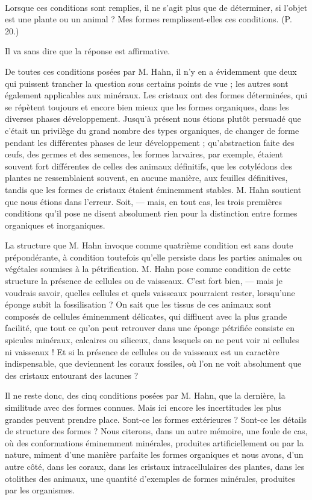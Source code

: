 \documentclass[a4paper, 12pt, oneside, french]{article}
\begin{document}
\paragraph{}
\og Lorsque ces conditions sont remplies, il ne s'agit plus que de déterminer, si l'objet est une plante ou un animal ? Mes formes remplissent-elles ces conditions. \fg (P. 20.)

Il va sans dire que la réponse est affirmative.

De toutes ces conditions posées par M. Hahn, il n'y en a évidemment que deux qui puissent trancher la question sous certains points de vue ; les autres sont également applicables aux minéraux. Les cristaux ont des formes déterminées, qui se répètent toujours et encore bien mieux que les formes organiques, dans les diverses phases développement. Jusqu'à présent nous étions plutôt persuadé que c'était un privilège du grand nombre des types organiques, de changer de forme pendant les différentes phases de leur développement ; qu'abstraction faite des œufs, des germes et des semences, les formes larvaires, par exemple, étaient souvent fort différentes de celles des animaux définitifs, que les cotylédons des plantes ne ressemblaient souvent, en aucune manière, aux feuilles définitives, tandis que les formes de cristaux étaient éminemment stables. M. Hahn soutient que nous étions dans l'erreur. Soit, --- mais, en tout cas, les trois premières conditions qu'il pose ne disent absolument rien pour la distinction entre formes organiques et inorganiques.

La structure que M. Hahn invoque comme quatrième condition est sans doute prépondérante, à condition toutefois qu'elle persiste dans les parties animales ou végétales soumises à la pétrification. M. Hahn pose comme condition de cette structure la présence de cellules ou de vaisseaux. C'est fort bien, --- mais je voudrais savoir, quelles cellules et quels vaisseaux pourraient rester, lorsqu'une éponge subit la fossilisation ? On sait que les tissus de ces animaux sont composés de cellules éminemment délicates, qui diffluent avec la plus grande facilité, que tout ce qu'on peut retrouver dans une éponge pétrifiée consiste en spicules minéraux, calcaires ou siliceux, dans lesquels on ne peut voir ni cellules ni vaisseaux ! Et si la présence de cellules ou de vaisseaux est un caractère indispensable, que deviennent les coraux fossiles, où l'on ne voit absolument que des cristaux entourant des lacunes ?

Il ne reste donc, des cinq conditions posées par M. Hahn, que la dernière, la similitude avec des formes connues. Mais ici encore les incertitudes les plus grandes peuvent prendre place. Sont-ce les formes extérieures ? Sont-ce les détails de structure des formes ? Nous citerons, dans un autre mémoire, une foule de cas, où des conformations éminemment minérales, produites artificiellement ou par la nature, miment d'une manière parfaite les formes organiques et nous avons, d'un autre côté, dans les coraux, dans les cristaux intracellulaires des plantes, dans les otolithes des animaux, une quantité d'exemples de formes minérales, produites par les organismes.
\end{document}
